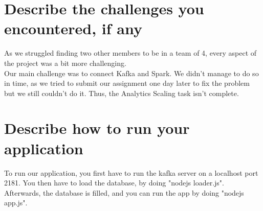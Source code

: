 \documentclass[11pt,a4paper]{article}
\begin{document}
\section{Describe the challenges you encountered, if any}
As we struggled finding two other members to be in a team of 4, every aspect of the project was a bit more challenging.\\

Our main challenge was to connect Kafka and Spark. We didn't manage to do so in time, as we tried to submit our assignment one day later to fix the problem but we still couldn't do it. Thus, the Analytics Scaling task isn't complete. 
\section{Describe how to run your application}

To run our application, you first have to run the kafka server on a localhost port 2181. You then have to load the database, by doing "nodejs loader.js". Afterwards, the database is filled, and you can run the app by doing "nodejs app.js". 
\end{document}
